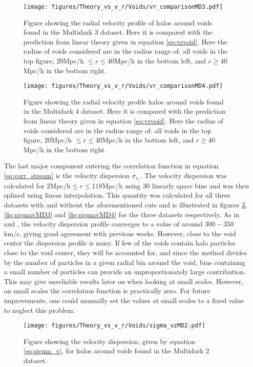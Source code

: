 \begin{figure}[H]
    \texttt{[image: figures/Theory\_vs\_v\_r/Voids/vr\_comparisonMD3.pdf]}
    \caption{Figure showing the radial velocity profile of halos around voids found in the Multidark 3 dataset. Here it is compared with the prediction from linear theory given in equation \ref{eq:vrvoid}. Here the radius of voids considered are in the radius range of: all voids in the top figure, $20$Mpc/h $\leq r\leq 40$Mpc/h in the bottom left, and $r\geq 40$Mpc/h in the bottom right.}
    \label{fig:vrMD3}
\end{figure}

\begin{figure}[H]
    \texttt{[image: figures/Theory\_vs\_v\_r/Voids/vr\_comparisonMD4.pdf]}
    \caption{Figure showing the radial velocity profile halos around voids found in the Multidark 4 dataset. Here it is compared with the prediction from linear theory given in equation \ref{eq:vrvoid}. Here the radius of voids considered are in the radius range of: all voids in the top figure, $20$Mpc/h $\leq r\leq 40$Mpc/h in the bottom left, and $r\geq 40$Mpc/h in the bottom right.}
    \label{fig:vrMD4}
\end{figure}
The last major component entering the correlation function in equation \ref{eq:corr_stream} is the velocity dispersion $\sigma_{v_z}$. The velocity dispersion was calculated for $2$Mpc/h$\leq r\leq 118$Mpc/h using $30$ linearly space bins and was then splined using linear interpolation. This quantity was calculated for all three datasets with and without the aforementioned cuts and is illustrated in figures \ref{fig:sigmavMD2}, \ref{fig:sigmavMD3} and \ref{fig:sigmavMD4} for the three datasets respectively. As in \cite{Nadathur_corr} and \cite{Achitouv_streaming}, the velocity dispersion profile converges to a value of around $300-350$ km/s, giving good agreement with previous works. However, close to the void center the dispersion profile is noisy. If few of the voids contain halo particles close to the void center, they will be accounted for, and since the method divides by the number of particles in a given radial bin around the void, bins containing a small number of particles can provide an unproportionately large contribution. This may give unreliable results later on when looking at small scales. However, on small scales the correlation function is practically zero. For future improvements, one could manually set the values at small scales to a fixed value to neglect this problem.
\begin{figure}[H]
    \texttt{[image: figures/Theory\_vs\_v\_r/Voids/sigma\_vzMD2.pdf]}
    \caption{Figure showing the velocity dispersion, given by equation \ref{eq:sigma_v}, for halos around voids found in the Multidark 2 dataset.}
    \label{fig:sigmavMD2}
\end{figure}

